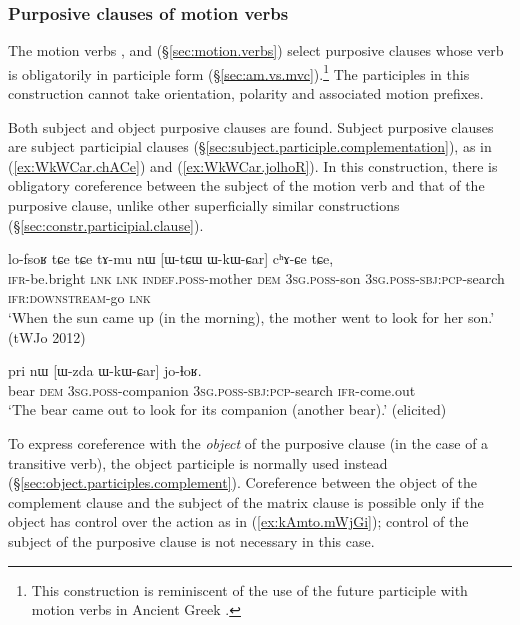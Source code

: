 \subsubsection{Purposive clauses of motion verbs} \label{sec:purposive.clause.motion.verbs}
 
The motion verbs ,  and   (§\ref{sec:motion.verbs}) select purposive clauses whose verb is obligatorily in participle form (§\ref{sec:am.vs.mvc}).\footnote{This construction is reminiscent of the use of the future participle with motion verbs in Ancient Greek \citep[§177.B]{vernhes96hermaion}. } The participles in this construction cannot take orientation, polarity and associated motion prefixes.

Both subject and object purposive clauses are found. Subject purposive clauses are subject participial clauses (§\ref{sec:subject.participle.complementation}), as in (\ref{ex:WkWCar.chACe}) and (\ref{ex:WkWCar.jolhoR}). In this construction, there is obligatory coreference between the subject of the motion verb and that of the purposive clause, unlike other superficially similar constructions (§\ref{sec:constr.participial.clause}).

\begin{exe}
	\ex \label{ex:WkWCar.chACe}
	\gll lo-fsoʁ tɕe tɕe tɤ-mu nɯ [ɯ-tɕɯ ɯ-kɯ-ɕar] cʰɤ-ɕe tɕe,\\
	\textsc{ifr}-be.bright \textsc{lnk} \textsc{lnk} \textsc{indef}.\textsc{poss}-mother \textsc{dem} \textsc{3sg}.\textsc{poss}-son \textsc{3sg}.\textsc{poss}-\textsc{sbj}:\textsc{pcp}-search \textsc{ifr}:\textsc{downstream}-go \textsc{lnk} \\
	\glt `When the sun came up (in the morning), the mother went to look for her son.' (tWJo 2012)
\end{exe}

\begin{exe}
	\ex \label{ex:WkWCar.jolhoR}
	\gll pri nɯ [ɯ-zda ɯ-kɯ-ɕar] jo-ɬoʁ. \\
	bear \textsc{dem} \textsc{3sg}.\textsc{poss}-companion \textsc{3sg}.\textsc{poss}-\textsc{sbj}:\textsc{pcp}-search \textsc{ifr}-come.out \\
	\glt `The bear came out to look for its companion (another bear).' (elicited)
\end{exe}

To express coreference with the \textit{object} of the purposive clause (in the case of a transitive verb), the object participle is normally used instead (§\ref{sec:object.participles.complement}).  Coreference between the object of the complement clause and the subject of the matrix clause is possible only if the object has control over the action as in (\ref{ex:kAmto.mWjGi}); control of the subject of the purposive clause is not necessary in this case.


